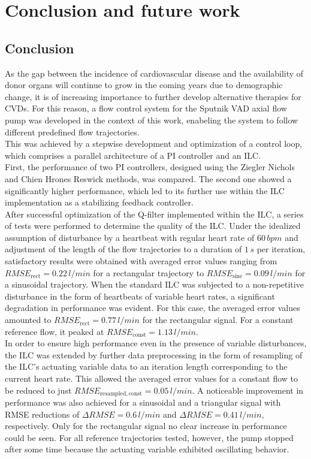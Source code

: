\chapter{Conclusion and future work}
\section{Conclusion}
As the gap between the incidence of cardiovascular disease and the availability of donor organs will continue to grow in the coming years due to demographic change, it is of increasing importance to further develop alternative therapies for CVDs.
For this reason, a flow control system for the Sputnik VAD axial flow pump was developed in the context of this work, enabeling the system to follow different predefined flow trajectories.
\\This was achieved by a stepwise development and optimization of a control loop, which comprises a parallel architecture of a PI controller and an ILC.
\\First, the performance of two PI controllers, designed using the Ziegler Nichols and Chien Hrones Reswick methods, was compared. The second one showed a significantly higher performance, which led to its further use within the ILC implementation as a stabilizing feedback controller.
\\After successful optimization of the Q-filter implemented within the ILC, a series of tests were performed to determine the quality of the ILC. Under the idealized assumption of disturbance by a heartbeat with regular heart rate of $60\, bpm$ and adjustment of the length of the flow trajectories to a duration of $1\,s$ per iteration, satisfactory results were obtained with averaged error values ranging from $RMSE_{\mathrm{rect}}=0.22\,l/min$ for a rectangular trajectory to $RMSE_{\mathrm{sine}}=0.09\,l/min$ for a sinusoidal trajectory. When the standard ILC was subjected to a non-repetitive disturbance in the form of heartbeats of variable heart rates, a significant degradation in performance was evident. For this case, the averaged error values amounted to $RMSE_{\mathrm{rect}}=0.77\,l/min$ for the rectangular signal. For a constant reference flow, it peaked at $RMSE_{\mathrm{const}}=1.13\, l/min$.
\\In order to ensure high performance even in the presence of variable disturbances, the ILC was extended by further data preprocessing in the form of resampling of the ILC's actuating variable data to an iteration length corresponding to the current heart rate. This allowed the averaged error values for a constant flow to be reduced to just $RMSE_{\mathrm{resampled,const}}=0.05\, l/min$. A noticeable improvement in performance was also achieved for a sinusoidal and a triangular signal with RMSE reductions of $\Delta{RMSE}=0.6\,l/min$ and $\Delta{RMSE}=0.41\,l/min$, respectively. Only for the rectangular signal no clear increase in performance could be seen.
For all reference trajectories tested, however, the pump stopped after some time because the actuating variable exhibited oscillating behavior.

